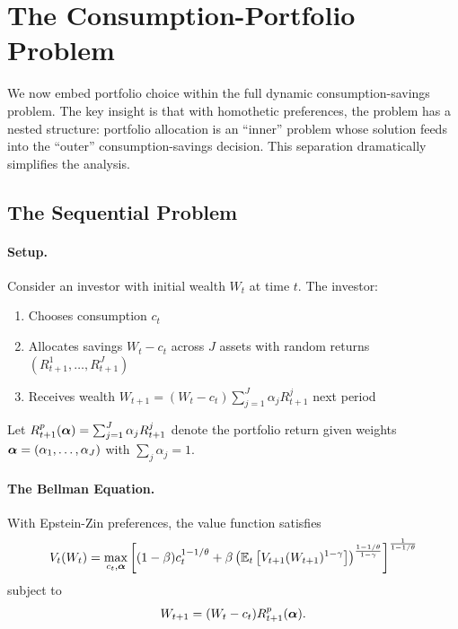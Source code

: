
\section{The Consumption-Portfolio Problem}
\label{sec:consumption-portfolio}

We now embed portfolio choice within the full dynamic consumption-savings problem. The key insight is that with homothetic preferences, the problem has a nested structure: portfolio allocation is an ``inner'' problem whose solution feeds into the ``outer'' consumption-savings decision. This separation dramatically simplifies the analysis.

\subsection{The Sequential Problem}
\label{subsec:sequential-problem}

\paragraph{Setup.}

Consider an investor with initial wealth $W_t$ at time $t$. The investor:
\begin{enumerate}[nosep]
    \item Chooses consumption $c_t$
    \item Allocates savings $W_t - c_t$ across $J$ assets with random returns $(R_{t+1}^1, \ldots, R_{t+1}^J)$
    \item Receives wealth $W_{t+1} = (W_t - c_t) \sum_{j=1}^{J} \alpha_j R_{t+1}^j$ next period
\end{enumerate}

Let $R_{t+1}^p(\boldsymbol{\alpha}) = \sum_{j=1}^{J} \alpha_j R_{t+1}^j$ denote the portfolio return given weights $\boldsymbol{\alpha} = (\alpha_1, \ldots, \alpha_J)$ with $\sum_j \alpha_j = 1$.

\paragraph{The Bellman Equation.}

With Epstein-Zin preferences, the value function satisfies
\begin{equation}
V_t(W_t) = \max_{c_t, \boldsymbol{\alpha}} \left[ (1-\beta) c_t^{1-1/\theta} + \beta \left( \mathbb{E}_t\left[ V_{t+1}(W_{t+1})^{1-\gamma} \right] \right)^{\frac{1-1/\theta}{1-\gamma}} \right]^{\frac{1}{1-1/\theta}}
\label{eq:bellman-ez}
\end{equation}
subject to
\begin{equation}
W_{t+1} = (W_t - c_t) R_{t+1}^p(\boldsymbol{\alpha}).
\label{eq:wealth-evolution}
\end{equation}

